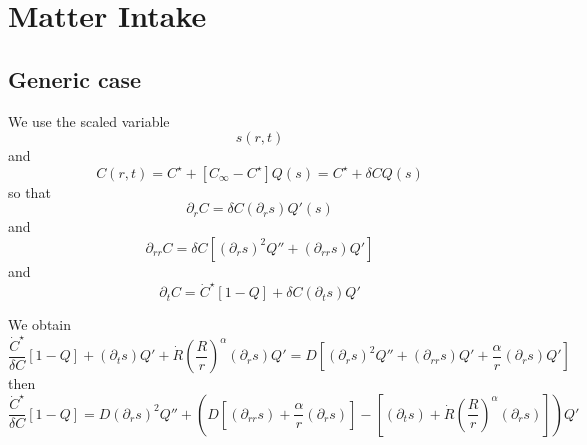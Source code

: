 \documentclass[11pt]{revtex4}
\begin{document}
\section{Matter Intake}
\subsection{Generic case}
We use the scaled variable
\begin{equation}
	s(r,t)
\end{equation}
and
\begin{equation}
	C(r,t) = C^\star + \left[C_\infty-C^\star\right] Q(s) = C^\star + \delta C Q(s)
\end{equation}
so that
\begin{equation}
	\partial_r C = \delta C \left(\partial_r s\right) Q'(s)
\end{equation}
and
\begin{equation}
	\partial_{rr} C = \delta C \left[ \left(\partial_r s\right)^2 Q'' + \left(\partial_{rr}s\right) Q'\right]
\end{equation}
and
\begin{equation}
	\partial_{t} C = \dot{C}^\star \left[1-Q\right] + \delta C \left(\partial_t s\right) Q'
\end{equation}

We obtain
\begin{equation}
	\dfrac{\dot{C}^\star}{\delta C} \left[1-Q\right] +  \left(\partial_t s\right) Q' 
	+\dot{R} \left(\dfrac{R}{r}\right)^\alpha \left(\partial_r s\right) Q' = D  \left[ \left(\partial_r s\right)^2 Q'' + \left(\partial_{rr}s\right) Q' + \dfrac{\alpha}{r} \left(\partial_r s\right) Q'\right]
\end{equation}
then
\begin{equation}
	\dfrac{\dot{C}^\star}{\delta C} \left[1-Q\right] = 
	 D \left(\partial_r s\right)^2 Q''
	+\left( D\left[\left(\partial_{rr}s\right) + \dfrac{\alpha}{r} \left(\partial_r s\right) \right] - \left[ \left(\partial_t s\right) + \dot{R} \left(\dfrac{R}{r}\right)^\alpha \left(\partial_r s\right)\right]\right)Q'
\end{equation}
\end{document}
